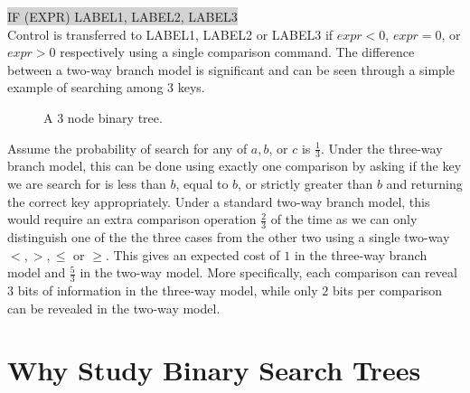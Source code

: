 \documentclass[letterpaper,12pt,titlepage,oneside,final]{book}
\theoremstyle{plain}
\begin{document}
\colorbox{lightgrey}{ \selectfont \uppercase{IF (expr) label1, label2, label3} } \\
 
Control is transferred to \uppercase{label1}, \uppercase{label2} or \uppercase{label3} if $expr < 0$, $expr=0$, or $expr > 0$ respectively using a single comparison command. The difference between a two-way branch model is significant and can be seen through a simple example of searching among 3 keys.

\begin{figure}[!ht]
\begin{center}

\caption{A 3 node binary tree.}

\end{center}
\end{figure}

Assume the probability of search for any of $a,b$, or $c$ is $\frac{1}{3}$. Under the three-way branch model, this can be done using exactly one comparison by asking if the key we are search for is less than $b$, equal to $b$, or strictly greater than $b$ and returning the correct key appropriately. Under a standard two-way branch model, this would require an extra comparison operation $\frac{2}{3}$ of the time as we can only distinguish one of the the three cases from the other two using a single two-way $<, >, \leq$ or $\geq$. This gives an expected cost of $1$ in the three-way branch model and $\frac{5}{3}$ in the two-way model. More specifically, each comparison can reveal $3$ bits of information in the three-way model, while only $2$ bits per comparison can be revealed in the two-way model. 

\section{Why Study Binary Search Trees}
\end{document}
